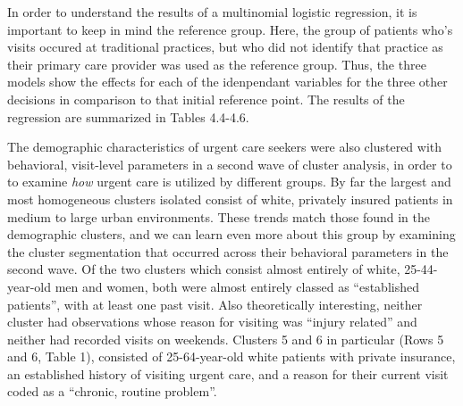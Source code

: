 \documentclass[12pt,twoside]{reedthesis}
\begin{document}
  In order to understand the results of a multinomial logistic regression,
  it is important to keep in mind the reference group. Here, the group of
  patients who's visits occured at traditional practices, but who did not
  identify that practice as their primary care provider was used as the
  reference group. Thus, the three models show the effects for each of the
  idenpendant variables for the three other decisions in comparison to
  that initial reference point. The results of the regression are
  summarized in Tables 4.4-4.6.
  
  The demographic characteristics of urgent care seekers were also
  clustered with behavioral, visit-level parameters in a second wave of
  cluster analysis, in order to to examine \emph{how} urgent care is
  utilized by different groups. By far the largest and most homogeneous
  clusters isolated consist of white, privately insured patients in medium
  to large urban environments. These trends match those found in the
  demographic clusters, and we can learn even more about this group by
  examining the cluster segmentation that occurred across their behavioral
  parameters in the second wave. Of the two clusters which consist almost
  entirely of white, 25-44-year-old men and women, both were almost
  entirely classed as ``established patients'', with at least one past
  visit. Also theoretically interesting, neither cluster had observations
  whose reason for visiting was ``injury related'' and neither had
  recorded visits on weekends. Clusters 5 and 6 in particular (Rows 5 and
  6, Table 1), consisted of 25-64-year-old white patients with private
  insurance, an established history of visiting urgent care, and a reason
  for their current visit coded as a ``chronic, routine problem''.
  
  \clearpage
  
  \singlespacing
  
\end{document}
